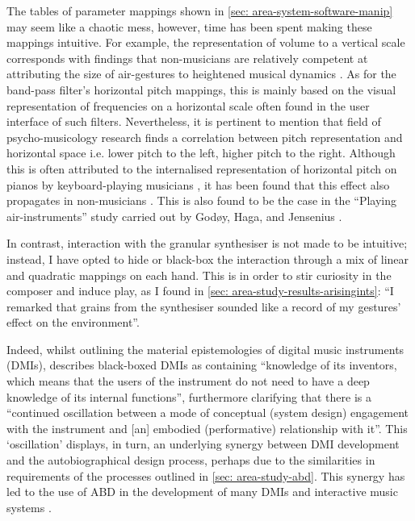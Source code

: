 The tables of parameter mappings shown in \autoref{sec: area-system-software-manip} may seem like a chaotic mess, however, time has been spent making these mappings intuitive. For example, the representation of volume to a vertical scale corresponds with findings that non-musicians are relatively competent at attributing the size of air-gestures to heightened musical dynamics \citep{godoy2006,caramiaux2010}. As for the band-pass filter’s horizontal pitch mappings, this is mainly based on the visual representation of frequencies on a horizontal scale often found in the user interface of such filters. Nevertheless, it is pertinent to mention that field of psycho-musicology research \citep{timmers2016} finds a correlation between pitch representation and horizontal space i.e. lower pitch to the left, higher pitch to the right. Although this is often attributed to the internalised representation of horizontal pitch on pianos by keyboard-playing musicians \citep{lidji2007,rusconi2006}, it has been found that this effect also propagates in non-musicians \citep{weis2016}. This is also found to be the case in the “Playing air-instruments” study carried out by Godøy, Haga, and Jensenius \citeyearpar{godoy2006}.

In contrast, interaction with the granular synthesiser is not made to be intuitive; instead, I have opted to hide or black-box the interaction through a mix of linear and quadratic mappings on each hand. This is in order to stir curiosity in the composer and induce play, as I found in \autoref{sec: area-study-results-arisingints}: “I remarked that grains from the synthesiser sounded like a record of my gestures’ effect on the environment”.

Indeed, whilst outlining the material epistemologies of digital music instruments (DMIs), \citep{magnusson2009} describes black-boxed DMIs as containing  “knowledge of its inventors, which means that the users of the instrument do not need to have a deep knowledge of its internal functions”, furthermore clarifying that there is a “continued oscillation between a mode of conceptual (system design) engagement with the instrument and [an] embodied (performative) relationship with it”. This ‘oscillation’ displays, in turn, an underlying synergy between DMI development and the autobiographical design process, perhaps due to the similarities in requirements of the processes outlined in \autoref{sec: area-study-abd}. This synergy has led to the use of ABD in the development of many DMIs and interactive music systems \citep{kiefer2020,martin2017,turchet2018,unander-scharin2014}.


